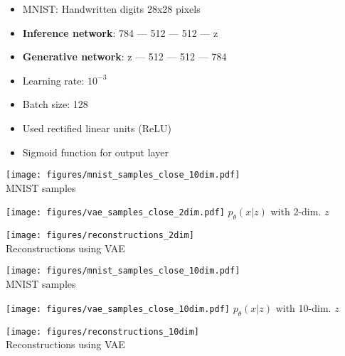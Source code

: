 \documentclass[11pt, a4paper, landscape]{article}
\begin{document}
\NewPage{}
\small


\normalsize


\FinalPage

\appendix

\NewPage{}
\vfill
\begin{itemize}
  \item MNIST: Handwritten digits 28x28 pixels
	\item \textbf{Inference network}: 784 --- 512 --- 512 --- z
	\item \textbf{Generative network}: z --- 512 --- 512 --- 784
	\item Learning rate: $10^{-3}$
  \item Batch size: 128
	\item Used rectified linear units (ReLU)
	\item Sigmoid function for output layer
\end{itemize}
\vfill

\NewPage{}
\begin{minipage}[t]{.5\linewidth}
	\begin{center}
		\texttt{[image: figures/mnist\_samples\_close\_10dim.pdf]}\\
		MNIST samples
	\end{center}
\end{minipage}
\begin{minipage}[t]{.5\linewidth}
	\begin{center}
		\texttt{[image: figures/vae\_samples\_close\_2dim.pdf]}
		$p_\theta(x|z)$ with 2-dim. $z$
	\end{center}
\end{minipage}
	\begin{center}
		\texttt{[image: figures/reconstructions\_2dim]}\\
		Reconstructions using VAE
	\end{center}

\NewPage{}
\begin{minipage}[t]{.5\linewidth}
	\begin{center}
		\texttt{[image: figures/mnist\_samples\_close\_10dim.pdf]}\\
		MNIST samples
	\end{center}
\end{minipage}
\begin{minipage}[t]{.5\linewidth}
	\begin{center}
		\texttt{[image: figures/vae\_samples\_close\_10dim.pdf]}
		$p_\theta(x|z)$ with 10-dim. $z$
	\end{center}
\end{minipage}
	\begin{center}
		\texttt{[image: figures/reconstructions\_10dim]}\\
		Reconstructions using VAE
	\end{center}
\end{document}
